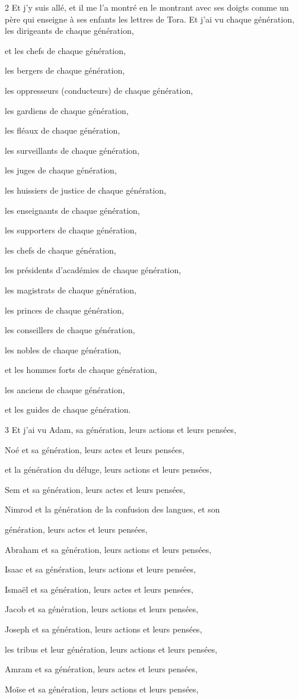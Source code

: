\par 2 Et j'y suis allé, et il me l'a montré en le montrant avec ses doigts comme un père qui enseigne à ses enfants les lettres de Tora. Et j'ai vu chaque génération, les dirigeants de chaque génération,
\par et les chefs de chaque génération,
\par les bergers de chaque génération,
\par les oppresseurs (conducteurs) de chaque génération,
\par les gardiens de chaque génération,
\par les fléaux de chaque génération,
\par les surveillants de chaque génération,
\par les juges de chaque génération,
\par les huissiers de justice de chaque génération,
\par les enseignants de chaque génération,
\par les supporters de chaque génération,
\par les chefs de chaque génération,
\par les présidents d'académies de chaque génération,
\par les magistrats de chaque génération,
\par les princes de chaque génération,
\par les conseillers de chaque génération,
\par les nobles de chaque génération,
\par et les hommes forts de chaque génération,
\par les anciens de chaque génération,
\par et les guides de chaque génération.

\par 3 Et j'ai vu Adam, sa génération, leurs actions et leurs pensées,
\par Noé et sa génération, leurs actes et leurs pensées,
\par et la génération du déluge, leurs actions et leurs pensées,
\par Sem et sa génération, leurs actes et leurs pensées,
\par Nimrod et la génération de la confusion des langues, et son
\par génération, leurs actes et leurs pensées,
\par Abraham et sa génération, leurs actions et leurs pensées,
\par Isaac et sa génération, leurs actions et leurs pensées,
\par Ismaël et sa génération, leurs actes et leurs pensées,
\par Jacob et sa génération, leurs actions et leurs pensées,
\par Joseph et sa génération, leurs actions et leurs pensées,
\par les tribus et leur génération, leurs actions et leurs pensées,
\par Amram et sa génération, leurs actes et leurs pensées,
\par Moïse et sa génération, leurs actions et leurs pensées,

